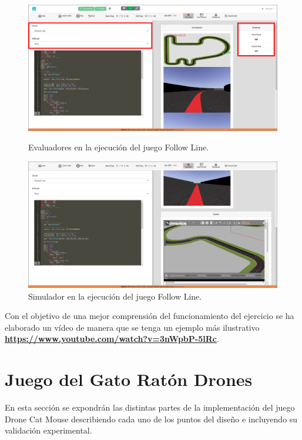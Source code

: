\documentclass[a4paper, 12pt]{book}
\begin{document}
\begin{figure}[H]
  \centering
  \begin{minipage}[b]{0.7\textwidth}
    \includegraphics[width=\textwidth]{img/fl_sim_1_rect.png}
    \caption{Evaluadores en la ejecución del juego Follow Line.}
    \label{figura:robot_davinci}
  \end{minipage}
  \hfill
  \begin{minipage}[b]{0.7\textwidth}
    \includegraphics[width=\textwidth]{img/fl_sim_2.png}
    \caption{Simulador en la ejecución del juego Follow Line.}
    \label{figura:robot_atrias}
  \end{minipage}
\end{figure}

Con el objetivo de una mejor comprensión del funcionamiento del ejercicio se ha elaborado un vídeo de manera que se tenga un ejemplo más ilustrativo \textbf{\url{https://www.youtube.com/watch?v=3nWpbP-5lRc}}.

\section{Juego del Gato Ratón Drones} 
\label{sec:drone_cat_mouse_game}

En esta sección se expondrán las distintas partes de la implementación del juego Drone Cat Mouse describiendo cada uno de los puntos del diseño e incluyendo su validación experimental.
\end{document}
